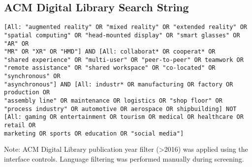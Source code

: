 \subsection{ACM Digital Library Search String}

\begin{verbatim}
[All: "augmented reality" OR "mixed reality" OR "extended reality" OR 
"spatial computing" OR "head-mounted display" OR "smart glasses" OR "AR" OR 
"MR" OR "XR" OR "HMD"] AND [All: collaborat* OR cooperat* OR 
"shared experience" OR "multi-user" OR "peer-to-peer" OR teamwork OR 
"remote assistance" OR "shared workspace" OR "co-located" OR "synchronous" OR 
"asynchronous"] AND [All: industr* OR manufacturing OR factory OR production OR 
"assembly line" OR maintenance OR logistics OR "shop floor" OR 
"process industry" OR automotive OR aerospace OR shipbuilding] NOT 
[All: gaming OR entertainment OR tourism OR medical OR healthcare OR retail OR 
marketing OR sports OR education OR "social media"]
\end{verbatim}

Note: ACM Digital Library publication year filter (>2016) was applied using the interface controls. Language filtering was performed manually during screening.
